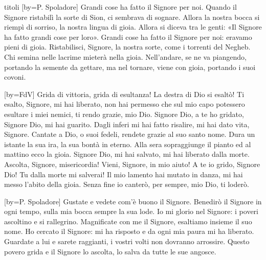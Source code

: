 \begin{songs}{titoli}
[by={P. Spoladore}]
\beginchorus
Grandi cose ha fatto il Signore per noi. 
\endchorus
\beginverse
Quando il Signore ristabilì la sorte di Sion,
ci sembrava di sognare.
Allora la nostra bocca si riempì di sorriso,
la nostra lingua di gioia.
\endverse
\beginverse
Allora si diceva tra le genti:
«Il Signore ha fatto grandi cose per loro».
Grandi cose ha fatto il Signore per noi:
eravamo pieni di gioia.
\endverse
\beginverse
Ristabilisci, Signore, la nostra sorte,
come i torrenti del Negheb.
Chi semina nelle lacrime
mieterà nella gioia.
\endverse
\beginverse
Nell'andare, se ne va piangendo,
portando la semente da gettare,
ma nel tornare, viene con gioia,
portando i suoi covoni.
\endverse
\endsong

[by={FdV}]
\beginchorus
Grida di vittoria, grida di esultanza! 
La destra di Dio si esaltò! 
\endchorus
\beginverse
Ti esalto, Signore, mi hai liberato,
non hai permesso che sul mio capo
potessero esultare i miei nemici,
ti rendo grazie, mio Dio.
Signore Dio, a te ho gridato,
Signore Dio, mi hai guarito.
Dagli inferi mi hai fatto risalire,
mi hai dato vita, Signore.
\endverse
\beginverse
Cantate a Dio, o suoi fedeli,
rendete grazie al suo santo nome.
Dura un istante la sua ira,
la sua bontà in eterno.
Alla sera sopraggiunge il pianto
ed al mattino ecco la gioia.
Signore Dio, mi hai salvato,
mi hai liberato dalla morte.
\endverse
\beginverse
Ascolta, Signore, misericordia!
Vieni, Signore, in mio aiuto!
A te io grido, Signore Dio!
Tu dalla morte mi salverai!
Il mio lamento hai mutato in danza,
mi hai messo l'abito della gioia.
Senza fine io canterò,
per sempre, mio Dio, ti loderò.
\endverse
\endsong

[by={P. Spoladore}]
\beginchorus
Gustate e vedete com'è buono il Signore. 
\endchorus
\beginverse
Benedirò il Signore in ogni tempo,
sulla mia bocca sempre la sua lode.
Io mi glorio nel Signore:
i poveri ascoltino e si rallegrino.
\endverse
\beginverse
Magnificate con me il Signore,
esaltiamo insieme il suo nome.
Ho cercato il Signore: mi ha risposto
e da ogni mia paura mi ha liberato.
\endverse
\beginverse
Guardate a lui e sarete raggianti,
i vostri volti non dovranno arrossire.
Questo povero grida e il Signore lo ascolta,
lo salva da tutte le sue angosce.
\endverse
\endsong


\end{songs}
